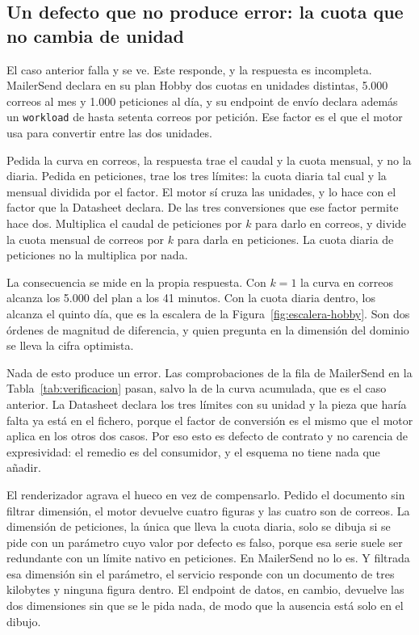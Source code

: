 \subsection{Un defecto que no produce error: la cuota que no cambia de unidad}
\label{subsec:evolucion:h1}

El caso anterior falla y se ve. Este responde, y la respuesta es incompleta.
MailerSend declara en su plan Hobby dos cuotas en unidades distintas, 5.000 correos
al mes y 1.000 peticiones al día, y su endpoint de envío declara además un
\texttt{workload} de hasta setenta correos por petición. Ese factor es el que el
motor usa para convertir entre las dos unidades.

Pedida la curva en correos, la respuesta trae el caudal y la cuota mensual, y no la
diaria. Pedida en peticiones, trae los tres límites: la cuota diaria tal cual y la
mensual dividida por el factor. El motor sí cruza las unidades, y lo hace con el
factor que la Datasheet declara. De las tres conversiones que ese factor permite
hace dos. Multiplica el caudal de peticiones por $k$ para darlo en correos, y
divide la cuota mensual de correos por $k$ para darla en peticiones. La cuota
diaria de peticiones no la multiplica por nada.

La consecuencia se mide en la propia respuesta. Con $k = 1$ la curva en correos
alcanza los 5.000 del plan a los 41 minutos. Con la cuota diaria dentro, los alcanza
el quinto día, que es la escalera de la Figura~\ref{fig:escalera-hobby}. Son dos
órdenes de magnitud de diferencia, y quien pregunta en la dimensión del dominio se
lleva la cifra optimista.

Nada de esto produce un error. Las comprobaciones de la fila de MailerSend en la
Tabla~\ref{tab:verificacion} pasan, salvo la de la curva acumulada, que es el caso
anterior. La Datasheet declara los tres límites con su unidad y la pieza que haría
falta ya está en el fichero, porque el factor de conversión es el mismo que el motor
aplica en los otros dos casos. Por eso esto es defecto de contrato y no carencia de
expresividad: el remedio es del consumidor, y el esquema no tiene nada que añadir.

El renderizador agrava el hueco en vez de compensarlo. Pedido el documento sin
filtrar dimensión, el motor devuelve cuatro figuras y las cuatro son de correos. La
dimensión de peticiones, la única que lleva la cuota diaria, solo se dibuja si se
pide con un parámetro cuyo valor por defecto es falso, porque esa serie suele ser
redundante con un límite nativo en peticiones. En MailerSend no lo es. Y filtrada
esa dimensión sin el parámetro, el servicio responde con un documento de tres
kilobytes y ninguna figura dentro. El endpoint de datos, en cambio, devuelve las dos
dimensiones sin que se le pida nada, de modo que la ausencia está solo en el dibujo.

